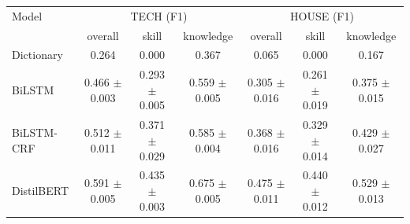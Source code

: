 \begin{tabular}{l ccc ccc}
\hline
Model & \multicolumn{3}{c}{TECH (F1)} & \multicolumn{3}{c}{HOUSE (F1)} \\
 & overall & skill & knowledge & overall & skill & knowledge \\
\hline
Dictionary & 0.264 & 0.000 & 0.367 & 0.065 & 0.000 & 0.167 \\
BiLSTM & 0.466 $\pm$ 0.003 & 0.293 $\pm$ 0.005 & 0.559 $\pm$ 0.005 & 0.305 $\pm$ 0.016 & 0.261 $\pm$ 0.019 & 0.375 $\pm$ 0.015 \\
BiLSTM-CRF & 0.512 $\pm$ 0.011 & 0.371 $\pm$ 0.029 & 0.585 $\pm$ 0.004 & 0.368 $\pm$ 0.016 & 0.329 $\pm$ 0.014 & 0.429 $\pm$ 0.027 \\
DistilBERT & 0.591 $\pm$ 0.005 & 0.435 $\pm$ 0.003 & 0.675 $\pm$ 0.005 & 0.475 $\pm$ 0.011 & 0.440 $\pm$ 0.012 & 0.529 $\pm$ 0.013 \\
\hline
\end{tabular}
